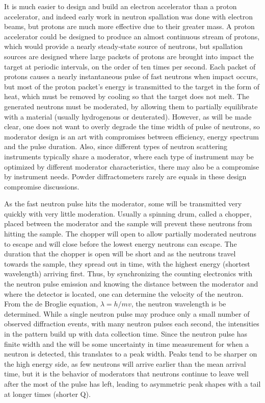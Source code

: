 It is much easier to design and build an electron accelerator than a proton accelerator, and indeed early work in neutron spallation was done with electron beams, but protons are much more effective due to their greater mass. A proton accelerator could be designed to produce an almost continuous stream of protons, which would provide a nearly steady-state source of neutrons, but spallation sources are designed where large packets of protons are brought into impact the target at periodic intervals, on the order of ten times per second. Each packet of protons causes a nearly instantaneous pulse of fast neutrons when impact occurs, but most of the proton packet's energy is transmitted to the target in the form of heat, which must be removed by cooling so that the target does not melt. The generated neutrons must be moderated, by allowing them to partially equilibrate with a material (usually hydrogenous or deuterated). However, as will be made clear, one does not want to overly degrade the time width of pulse of neutrons, so moderator design is an art with compromises between efficiency, energy spectrum and the pulse duration. Also, since different types of neutron scattering instruments typically share a moderator, where each type of instrument may be optimized by different moderator characteristics, there may also be a compromise by instrument needs. Powder diffractometers rarely are equals in these design compromise discussions.  

As the fast neutron pulse hits the moderator, some will be transmitted very quickly with very little moderation. Usually a spinning drum, called a chopper, placed between the moderator and the sample will prevent these neutrons from hitting the sample. The chopper will open to allow partially moderated neutrons to escape and will close before the lowest energy neutrons can escape. The duration that the chopper is open will be short and as the neutrons travel towards the sample, they spread out in time, with the highest energy (shortest wavelength) arriving first. Thus, by synchronizing the counting electronics with the neutron pulse emission and knowing the distance between the moderator and where the detector is located, one can determine the velocity of the neutron. From the de Broglie equation, $\lambda = h/{mv}$, the neutron  wavelength is be determined. While a single neutron pulse may produce only a small number of observed diffraction events, with many neutron pulses each second, the intensities in the pattern build up with data collection time. Since the neutron pulse has finite width and the will be some uncertainty in time measurement for when a neutron is detected, this translates to a peak width. Peaks tend to be sharper on the high energy side, as few neutrons will arrive earlier than the mean arrival time, but it is the behavior of moderators that neutrons continue to leave well after the most of the pulse has left, leading to asymmetric peak shapes with a tail at longer times (shorter Q). 

